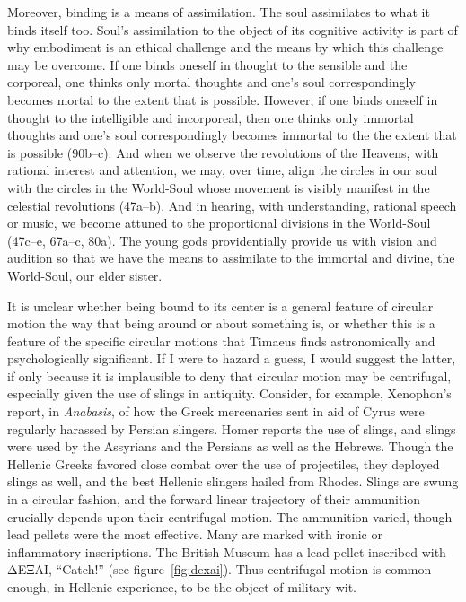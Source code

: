 Moreover, binding is a means of assimilation. The soul assimilates to what it binds itself too. Soul's assimilation to the object of its cognitive activity is part of why embodiment is an ethical challenge and the means by which this challenge may be overcome. If one binds oneself in thought to the sensible and the corporeal, one thinks only mortal thoughts and one's soul correspondingly becomes mortal to the extent that is possible. However, if one binds oneself in thought to the intelligible and incorporeal, then one thinks only immortal thoughts and one's soul correspondingly becomes immortal to the the extent that is possible (90b--c). And when we observe the revolutions of the Heavens, with rational interest and attention, we may, over time, align the circles in our soul with the circles in the World-Soul whose movement is visibly manifest in the celestial revolutions (47a--b). And in hearing, with understanding, rational speech or music, we become attuned to the proportional divisions in the World-Soul (47c--e, 67a--c, 80a). The young gods providentially provide us with vision and audition so that we have the means to assimilate to the immortal and divine, the World-Soul, our elder sister.

It is unclear whether being bound to its center is a general feature of circular motion the way that being around or about something is, or whether this is a feature of the specific circular motions that Timaeus finds astronomically and psychologically significant. If I were to hazard a guess, I would suggest the latter, if only because it is implausible to deny that circular motion may be centrifugal, especially given the use of slings in antiquity. Consider, for example, Xenophon's report, in \emph{Anabasis}, of how the Greek mercenaries sent in aid of Cyrus were regularly harassed by Persian slingers. Homer reports the use of slings, and slings were used by the Assyrians and the Persians as well as the Hebrews. Though the Hellenic Greeks favored close combat over the use of projectiles, they deployed slings as well, and the best Hellenic slingers hailed from Rhodes. Slings are swung in a circular fashion, and the forward linear trajectory of their ammunition crucially depends upon their centrifugal motion. The ammunition varied, though lead pellets were the most effective. Many are marked with ironic or inflammatory inscriptions. The British Museum has a lead pellet inscribed with {\sbl ΔΕΞΑΙ}, ``Catch!'' (see figure~\ref{fig:dexai}). Thus centrifugal motion is common enough, in Hellenic experience, to be the object of military wit.

